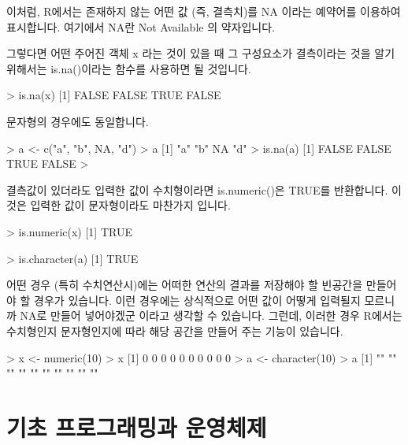 이처럼, R에서는 존재하지 않는 어떤 값 (즉, 결측치)를 NA 이라는 예약어를 이용하여 표시합니다. 
여기에서 NA란 Not Available 의 약자입니다. 

그렇다면 어떤 주어진 객체 x 라는 것이 있을 때 그 구성요소가 결측이라는 것을 알기 위해서는 is.na()이라는 함수를 사용하면 될 것입니다. 

\begin{Schunk}
\begin{Soutput}
> is.na(x)
[1] FALSE FALSE  TRUE FALSE
\end{Soutput}
\end{Schunk}

문자형의 경우에도 동일합니다. 

\begin{Schunk}
\begin{Soutput}
> a <- c("a", "b", NA, "d")
> a
[1] "a" "b" NA  "d"
> is.na(a)
[1] FALSE FALSE  TRUE FALSE
> 
\end{Soutput}
\end{Schunk}

결측값이 있더라도 입력한 값이 수치형이라면 is.numeric()은 TRUE를 반환합니다. 
이것은 입력한 값이 문자형이라도 마찬가지 입니다.

\begin{Schunk}
\begin{Soutput}
> is.numeric(x)
[1] TRUE

> is.character(a)
[1] TRUE
\end{Soutput}
\end{Schunk}

어떤 경우 (특히 수치연산시)에는 어떠한 연산의 결과를 저장해야 할 빈공간을 만들어야 할 경우가 있습니다.
이런 경우에는 상식적으로 어떤 값이 어떻게 입력될지 모르니까 NA로 만들어 넣어야겠군 이라고 생각할 수 있습니다. 
그런데, 이러한 경우 R에서는 수치형인지 문자형인지에 따라 해당 공간을 만들어 주는 기능이 있습니다. 

\begin{Schunk}
\begin{Soutput}
> x <- numeric(10)
> x
 [1] 0 0 0 0 0 0 0 0 0 0
> a <- character(10)
> a
 [1] "" "" "" "" "" "" "" "" "" ""
\end{Soutput}
\end{Schunk}



%
%


\chapter{기초 프로그래밍과 운영체제}


